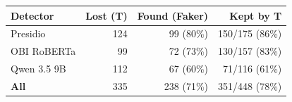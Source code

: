\begin{tabular}{lrrr}
\toprule
Detector & Lost (T) & Found (Faker) & Kept by T\\
\midrule
Presidio & 124 & 99 (80\%) & 150/175 (86\%)\\
OBI RoBERTa & 99 & 72 (73\%) & 130/157 (83\%)\\
Qwen 3.5 9B & 112 & 67 (60\%) & 71/116 (61\%)\\
\textbf{All} & 335 & 238 (71\%) & 351/448 (78\%)\\
\bottomrule
\end{tabular}

